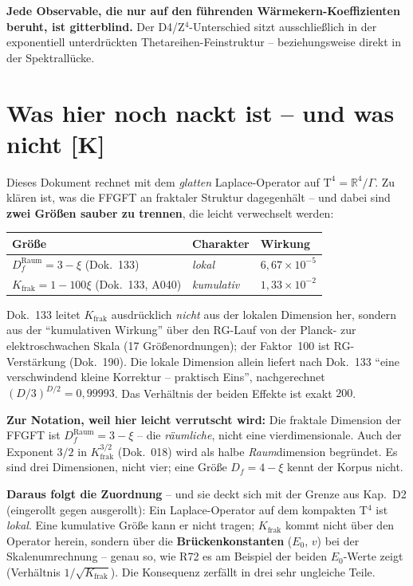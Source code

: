 \textbf{Jede Observable, die nur auf den führenden
Wärmekern-Koeffizienten beruht, ist gitterblind.} Der
D4/Z$^4$-Unterschied sitzt ausschließlich in der exponentiell
unterdrückten Thetareihen-Feinstruktur -- beziehungsweise direkt in
der Spektrallücke.

\chapter{Was hier noch nackt ist -- und was nicht [K]}

Dieses Dokument rechnet mit dem \emph{glatten} Laplace-Operator auf
$\text{T}^4 = \mathbb{R}^4/\Gamma$. Zu klären ist, was die FFGFT
an fraktaler Struktur dagegenhält -- und dabei sind \textbf{zwei
Größen sauber zu trennen}, die leicht verwechselt werden:

\begin{center}
\begin{tabular}{lll}
\toprule
Größe & Charakter & Wirkung \\
\midrule
$D_f^\text{Raum} = 3-\xi$ (Dok.~133) & \emph{lokal} &
  $6{,}67\times10^{-5}$ \\
$K_\text{frak} = 1-100\xi$ (Dok.~133, A040) & \emph{kumulativ} &
  $1{,}33\times10^{-2}$ \\
\bottomrule
\end{tabular}
\end{center}

\noindent Dok.~133 leitet $K_\text{frak}$ ausdrücklich \emph{nicht}
aus der lokalen Dimension her, sondern aus der \enquote{kumulativen
Wirkung} über den RG-Lauf von der Planck- zur elektroschwachen
Skala (17 Größenordnungen); der Faktor~100 ist RG-Verstärkung
(Dok.~190). Die lokale Dimension allein liefert nach Dok.~133
\enquote{eine verschwindend kleine Korrektur -- praktisch Eins},
nachgerechnet $(D/3)^{D/2} = 0{,}99993$. Das Verhältnis der beiden
Effekte ist exakt $200$.

\textbf{Zur Notation, weil hier leicht verrutscht wird:} Die
fraktale Dimension der FFGFT ist $D_f^\text{Raum} = 3-\xi$ -- die
\emph{räumliche}, nicht eine vierdimensionale. Auch der Exponent
$3/2$ in $K_\text{frak}^{3/2}$ (Dok.~018) wird als halbe
\emph{Raum}dimension begründet. Es sind drei Dimensionen, nicht
vier; eine Größe $D_f = 4-\xi$ kennt der Korpus nicht.

\textbf{Daraus folgt die Zuordnung} -- und sie deckt sich mit der
Grenze aus Kap.~D2 (eingerollt gegen ausgerollt): Ein
Laplace-Operator auf dem kompakten T$^4$ ist \emph{lokal}. Eine
kumulative Größe kann er nicht tragen; $K_\text{frak}$ kommt nicht
über den Operator herein, sondern über die \textbf{Brücken\-kon\-stan\-ten}
($E_0$, $v$) bei der Skalenumrechnung -- genau so, wie R72 es am
Beispiel der beiden $E_0$-Werte zeigt (Verhältnis $1/\sqrt{K_\text{frak}}$).
Die Konsequenz zerfällt in drei sehr ungleiche Teile.

